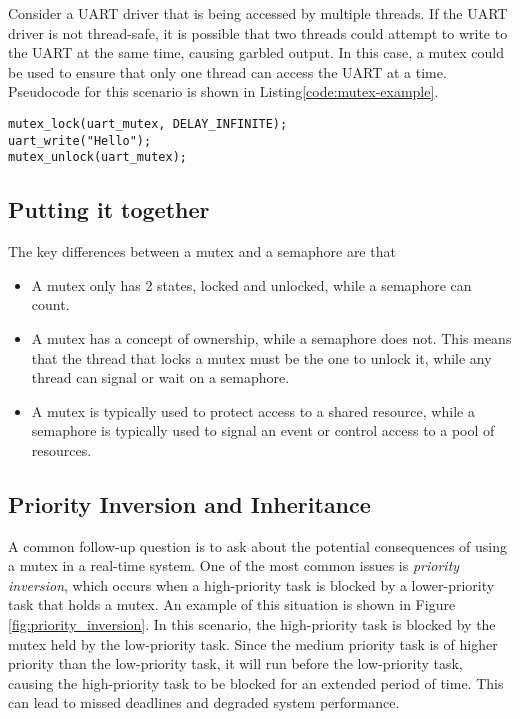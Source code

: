 \documentclass[main.tex]{subfiles}
\begin{document}
\noindent Consider a UART driver that is being accessed by multiple threads. If the UART driver is not thread-safe, it is possible that two threads could attempt to write to the UART at the same time, causing garbled output. In this case, a mutex could be used to ensure that only one thread can access the UART at a time. Pseudocode for this scenario is shown in Listing\ref{code:mutex-example}.
\begin{lstlisting}[caption={Example of Mutex Usage}, label={code:mutex-example}]
mutex_lock(uart_mutex, DELAY_INFINITE);
uart_write("Hello");
mutex_unlock(uart_mutex);
\end{lstlisting}

\subsection{Putting it together}
The key differences between a mutex and a semaphore are that
\begin{itemize}
    \item A mutex only has 2 states, locked and unlocked, while a semaphore can count.
    \item A mutex has a concept of ownership, while a semaphore does not. This means that the thread that locks a mutex must be the one to unlock it, while any thread can signal or wait on a semaphore.
    \item A mutex is typically used to protect access to a shared resource, while a semaphore is typically used to signal an event or control access to a pool of resources.
\end{itemize}

\subsection{Priority Inversion and Inheritance}
A common follow-up question is to ask about the potential consequences of using a mutex in a real-time system. One of the most common issues is \textit{priority inversion}, which occurs when a high-priority task is blocked by a lower-priority task that holds a mutex. An example of this situation is shown in Figure \ref{fig:priority_inversion}. In this scenario, the high-priority task is blocked by the mutex held by the low-priority task. Since the medium priority task is of higher priority than the low-priority task, it will run before the low-priority task, causing the high-priority task to be blocked for an extended period of time. This can lead to missed deadlines and degraded system performance.
\end{document}
